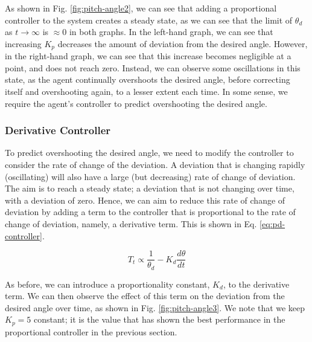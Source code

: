 \documentclass[12pt]{article}
\begin{document}
As shown in Fig. \ref{fig:pitch-angle2}, we can see that adding a proportional controller to the system creates a steady state, as we can see that the limit of $\theta_d$ as $t \to \infty$ is $\approx 0$ in both graphs. In the left-hand graph, we can see that increasing $K_p$ decreases the amount of deviation from the desired angle. However, in the right-hand graph, we can see that this increase becomes negligible at a point, and does not reach zero. Instead, we can observe some oscillations in this state, as the agent continually overshoots the desired angle, before correcting itself and overshooting again, to a lesser extent each time. In some sense, we require the agent's controller to predict overshooting the desired angle.

\subsubsection{Derivative Controller}

To predict overshooting the desired angle, we need to modify the controller to consider the rate of change of the deviation. A deviation that is changing rapidly (oscillating) will also have a large (but decreasing) rate of change of deviation. The aim is to reach a steady state; a deviation that is not changing over time, with a deviation of zero. Hence, we can aim to reduce this rate of change of deviation by adding a term to the controller that is proportional to the rate of change of deviation, namely, a derivative term. This is shown in Eq. \ref{eq:pd-controller}.

\begin{equation}
    T_t \propto \frac{1}{\theta_d} - K_d \frac{d\theta}{dt}
    \label{eq:pd-controller}
\end{equation}

As before, we can introduce a proportionality constant, $K_d$, to the derivative term. We can then observe the effect of this term on the deviation from the desired angle over time, as shown in Fig. \ref{fig:pitch-angle3}. We note that we keep $K_p = 5$ constant; it is the value that has shown the best performance in the proportional controller in the previous section.
\end{document}
